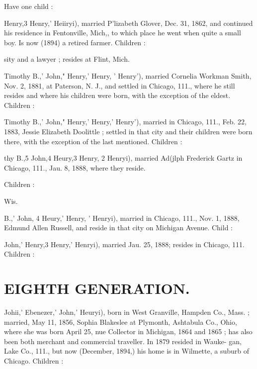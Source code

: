 \documentclass[oneside]{book}
\begin{document}
Have one child : 


Henry,3 Henry,' Heiiryi), married P'lizabeth Glover, Dec. 31, 
1862, and continued his residence in Fentonville, Mich,, to which 
place he went when quite a small boy. Is now (1894) a retired 
farmer. Children : 

sity and a lawyer ; resides at Flint, Mich. 










Timothy B.,' John," Henry,' Henry, ' Henry'), married Cornelia 
Workman Smith, Nov. 2, 1881, at Paterson, N. J., and settled 
in Chicago, 111., where he still resides and where his children 
were born, with the exception of the eldest. Children : 





Timothy B.,' John," Henry,' Henry,' Henry'), married in 
Chicago, 111., Feb. 22, 1883, Jessie Elizabeth Doolittle ; settled 
in that city and their children were born there, with the exception 
of the last mentioned. Children : 









thy B.,5 John,4 Heury,3 Henry, 2 Henryi), married Ad(jlph 
Frederick Gartz in Chicago, 111., Jau. 8, 1888, where they reside. 

Children : 



Wis. 

B.,' John, 4 Heury,' Henry, ' Henryi), married in Chicago, 111., 
Nov. 1, 1888, Edmund Allen Russell, and reside in that city on 
Michigan Avenue. Child : 


John,' Henry,3 Henry,' Henryi), married Jau. 25, 1888; resides 
in Chicago, 111. Children : 




\section{EIGHTH GENERATION.}


Johii,' Ebenezer,' John,' Heuryi), born in West Granville, 
Hampden Co., Mass. ; married, May 11, 1856, Sophia Blakeslee 
at Plymonth, Ashtabula Co., Ohio, where she was born April 25, 
nue Collector in Michigan, 1864 and 1865 ; has also been both 
merchant and commercial traveller. In 1879 resided in Wauke- 
gan, Lake Co., 111., but now (December, 1894,) his home is in 
Wilmette, a suburb of Chicago. Children : 
\end{document}
